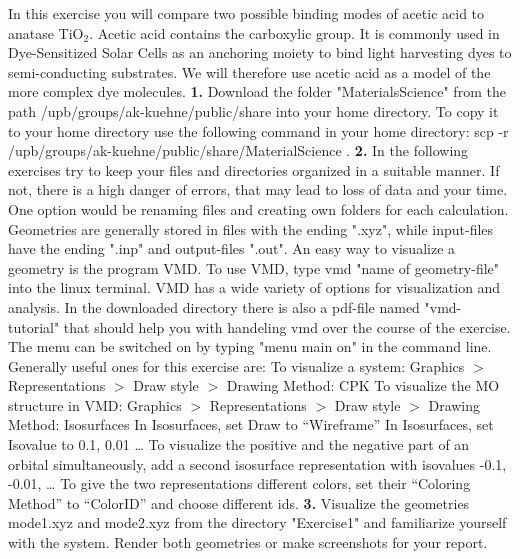 \documentclass[]{article}
\begin{document}
In this exercise you will compare two possible binding modes of acetic acid to anatase TiO$_{2}$. Acetic acid contains the carboxylic group. It is commonly used in Dye-Sensitized Solar Cells as an anchoring moiety to bind light harvesting dyes to semi-conducting substrates. We will therefore use acetic acid as a model of the more complex dye molecules.
\newline
\newline
\textbf{1.} Download the folder "MaterialsScience" from the path /upb/groups/ak-kuehne/public/share into your home directory. To copy it to your home directory use the following command in your home directory:
\newline
scp -r /upb/groups/ak-kuehne/public/share/MaterialScience .
\newline
\newline
\textbf{2.} In the following exercises try to keep your files and directories organized in a suitable manner. If not, there is a high danger of errors, that may lead to loss of data and your time. One option would be renaming files and creating own folders for each calculation. 
\newline
\newline
Geometries are generally stored in files with the ending ".xyz", while input-files have the ending ".inp" and output-files ".out". An easy way to visualize a geometry is the program VMD. To use VMD, type vmd "name of geometry-file" into the linux terminal. VMD has a wide variety of options for visualization and analysis. In the downloaded directory there is also a pdf-file named "vmd-tutorial" that should help you with handeling vmd over the course of the exercise. The menu can be switched on by typing "menu main on" in the command line. Generally useful ones for this exercise are:
\newline
\newline 
\newpage
To visualize a system:
Graphics $>$ Representations $>$ Draw style $>$ Drawing Method: CPK
To visualize the MO structure in VMD:
Graphics $>$ Representations $>$ Draw style $>$ Drawing Method: Isosurfaces
In Isosurfaces, set Draw to “Wireframe” 
In Isosurfaces, set Isovalue to 0.1, 0.01 …
To visualize the positive and the negative part of an orbital simultaneously, add a second isosurface representation with isovalues -0.1, -0.01, …
To give the two representations different colors, set their “Coloring Method” to “ColorID” and choose different ids. 
\newline
\newline
\textbf{3.} Visualize the geometries mode1.xyz and mode2.xyz from the directory "Exercise1" and familiarize yourself with the system. Render both geometries or make screenshots for your report.  
\end{document}
